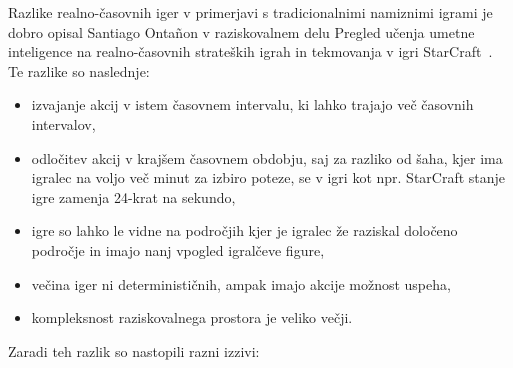 \documentclass[a4paper, 12pt]{book}
\begin{document}
Razlike realno-časovnih iger v primerjavi s tradicionalnimi namiznimi igrami je dobro opisal Santiago Ontañon v raziskovalnem delu Pregled učenja umetne inteligence na realno-časovnih strateških igrah in tekmovanja v igri StarCraft~\cite{survey_real_time_strategy_ai_research_starcraft}.
Te razlike so naslednje:
\begin{itemize}
	\item izvajanje akcij v istem časovnem intervalu, ki lahko trajajo več časovnih intervalov,
	\item odločitev akcij v krajšem časovnem obdobju, saj za razliko od šaha, kjer ima igralec na voljo več minut za izbiro poteze, se v igri kot npr. StarCraft stanje igre zamenja 24-krat na sekundo,
	\item igre so lahko le vidne na področjih kjer je igralec že raziskal določeno področje in imajo nanj vpogled igralčeve figure,
	\item večina iger ni determinističnih, ampak imajo akcije možnost uspeha,
	\item kompleksnost raziskovalnega prostora je veliko večji.

\end{itemize}

Zaradi teh razlik so nastopili razni izzivi:
\end{document}
